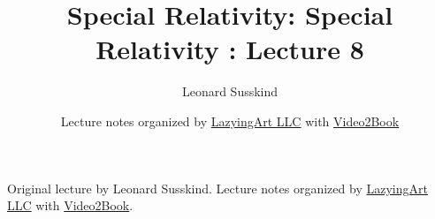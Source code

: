 \documentclass[11pt,oneside]{book}
\begin{document}
\frontmatter
\title{Special Relativity: Special Relativity : Lecture 8}
\author{Leonard Susskind}
\date{Lecture notes organized by \href{https://lazying.art}{LazyingArt LLC} with \href{https://github.com/lachlanchen/Video2Book}{Video2Book}}
\maketitle
\begin{center}
\small Original lecture by Leonard Susskind. Lecture notes organized by \href{https://lazying.art}{LazyingArt LLC} with \href{https://github.com/lachlanchen/Video2Book}{Video2Book}.
\end{center}
\clearpage
\mainmatter

\end{document}
